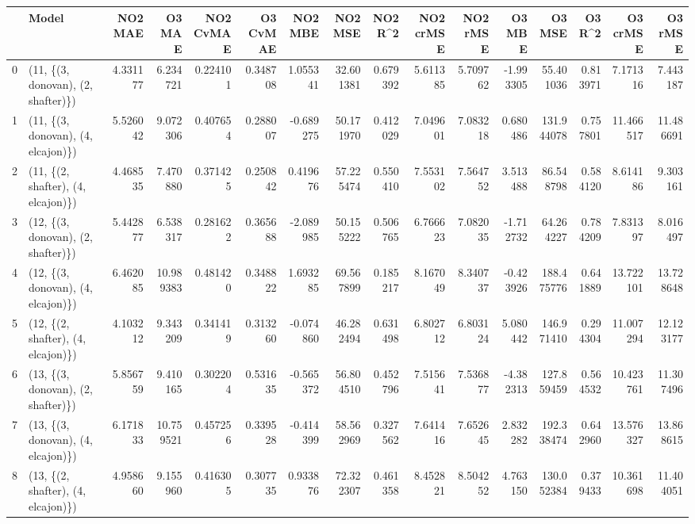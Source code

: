 \begin{tabular}{llrrrrrrrrrrrrrr}
\toprule
{} &                               Model &   NO2 MAE &     O3 MAE &  NO2 CvMAE &  O3 CvMAE &   NO2 MBE &     NO2 MSE &   NO2 R\textasciicircum2 &  NO2 crMSE &   NO2 rMSE &    O3 MBE &      O3 MSE &    O3 R\textasciicircum2 &   O3 crMSE &    O3 rMSE \\
\midrule
0  &  (11, \{(3, donovan), (2, shafter)\}) &  4.331177 &   6.234721 &   0.224101 &  0.348708 &  1.055341 &   32.601381 &  0.679392 &   5.611385 &   5.709762 & -1.993305 &   55.401036 &  0.813971 &   7.171316 &   7.443187 \\
1  &  (11, \{(3, donovan), (4, elcajon)\}) &  5.526042 &   9.072306 &   0.407654 &  0.288007 & -0.689275 &   50.171970 &  0.412029 &   7.049601 &   7.083218 &  0.680486 &  131.944078 &  0.757801 &  11.466517 &  11.486691 \\
2  &  (11, \{(2, shafter), (4, elcajon)\}) &  4.468535 &   7.470880 &   0.371425 &  0.250842 &  0.419676 &   57.225474 &  0.550410 &   7.553102 &   7.564752 &  3.513488 &   86.548798 &  0.584120 &   8.614186 &   9.303161 \\
3  &  (12, \{(3, donovan), (2, shafter)\}) &  5.442877 &   6.538317 &   0.281622 &  0.365688 & -2.089985 &   50.155222 &  0.506765 &   6.766623 &   7.082035 & -1.712732 &   64.264227 &  0.784209 &   7.831397 &   8.016497 \\
4  &  (12, \{(3, donovan), (4, elcajon)\}) &  6.462085 &  10.989383 &   0.481420 &  0.348822 &  1.693285 &   69.567899 &  0.185217 &   8.167049 &   8.340737 & -0.423926 &  188.475776 &  0.641889 &  13.722101 &  13.728648 \\
5  &  (12, \{(2, shafter), (4, elcajon)\}) &  4.103212 &   9.343209 &   0.341419 &  0.313260 & -0.074860 &   46.282494 &  0.631498 &   6.802712 &   6.803124 &  5.080442 &  146.971410 &  0.294304 &  11.007294 &  12.123177 \\
6  &  (13, \{(3, donovan), (2, shafter)\}) &  5.856759 &   9.410165 &   0.302204 &  0.531635 & -0.565372 &   56.804510 &  0.452796 &   7.515641 &   7.536877 & -4.382313 &  127.859459 &  0.564532 &  10.423761 &  11.307496 \\
7  &  (13, \{(3, donovan), (4, elcajon)\}) &  6.171833 &  10.759521 &   0.457256 &  0.339528 & -0.414399 &   58.562969 &  0.327562 &   7.641416 &   7.652645 &  2.832282 &  192.338474 &  0.642960 &  13.576327 &  13.868615 \\
8  &  (13, \{(2, shafter), (4, elcajon)\}) &  4.958660 &   9.155960 &   0.416305 &  0.307735 &  0.933876 &   72.322307 &  0.461358 &   8.452821 &   8.504252 &  4.763150 &  130.052384 &  0.379433 &  10.361698 &  11.404051 \\

\end{tabular}
